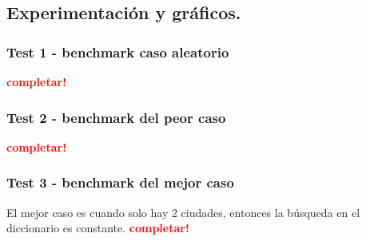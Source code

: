 \subsection{Experimentación y gráficos.}

\vspace*{0.3cm}

\subsubsection{Test 1 - benchmark caso aleatorio}

\textcolor{red}{\textbf{completar!}}


\newpage
\subsubsection{Test 2 - benchmark del peor caso}



\textcolor{red}{\textbf{completar!}}


\newpage
\subsubsection{Test 3 - benchmark del mejor caso}

El mejor caso es cuando solo hay 2 ciudades, entonces la búsqueda en el
diccionario es constante.
\textcolor{red}{\textbf{completar!}}

